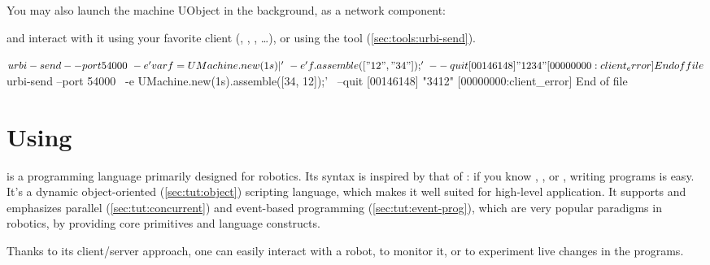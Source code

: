 You may also launch the machine UObject in the background, as a network
component:


\noindent
and interact with it using your favorite client (,
, , \ldots), or using the 
tool (\autoref{sec:tools:urbi-send}).

\begin{shell}[alsolanguage={[interactive]urbiscript}]
$ urbi-send --port 54000                     \
            -e 'var f = UMachine.new(1s)|'   \
            -e 'f.assemble(["12", "34"]);'   \
            --quit
[00146148] "1234"
[00000000:client_error] End of file
$ urbi-send --port 54000                              \
            -e UMachine.new(1s).assemble([34, 12]);'  \
            --quit
[00146148] "3412"
[00000000:client_error] End of file
\end{shell}




\section{Using \us}


\us is a programming language primarily designed for robotics.  Its syntax
is inspired by that of \Cxx: if you know \C, \Cxx, \Java or \Cs, writing \us
programs is easy.  It's a dynamic object-oriented (\autoref{sec:tut:object})
scripting language, which makes it well suited for high-level application.
It supports and emphasizes parallel (\autoref{sec:tut:concurrent}) and
event-based programming (\autoref{sec:tut:event-prog}), which are very
popular paradigms in robotics, by providing core primitives and language
constructs.

Thanks to its client/server approach, one can easily interact with a robot,
to monitor it, or to experiment live changes in the \us programs.

